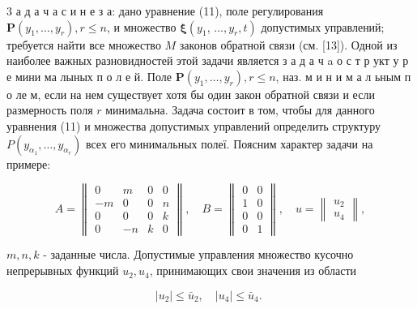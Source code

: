 \documentclass[10pt]{article}
\begin{document}
3 а д а ч а с и н е з а: дано уравнение (11), поле регулирования $\boldsymbol{P}\left(y_{1}, \ldots, y_{r}\right), r \leqslant n$, и множество $\boldsymbol{\xi}\left(y_{1}\right.$, $\left.\ldots, y_{r}, t\right)$ допустимых управлений; требуется найти все множество $M$ законов обратной связи (см. [13]). Одной из наиболее важных разновидностей этой задачи является з а д а ч a о с т р укт у р е мини ма лыных п о л е й. Поле $\boldsymbol{P}\left(y_{1}, \ldots, y_{r}\right), r \leqslant n$, наз. м и н и м а л ьным п о ле м, если на нем существует хотя бы один закон обратной связи и если размерность поля $r$ минимальна. Задача состоит в том, чтобы для данного уравнения (11) и множества допустимых управлений определить структуру $P\left(y_{\alpha_{1}}, \ldots, y_{\alpha_{r}}\right)$ всех его минимальных полеї. Поясним характер задачи на примере:



\[

A=\left\|\begin{array}{rrrr}

0 & m & 0 & 0 \\

-m & 0 & 0 & n \\

0 & 0 & 0 & k \\

0 & -n & k & 0

\end{array}\right\|, \quad B=\left\|\begin{array}{ll}

0 & 0 \\

1 & 0 \\

0 & 0 \\

0 & 1

\end{array}\right\|, \quad u=\left\|\begin{array}{l}

u_{2} \\

u_{4}

\end{array}\right\|,

\]



$m, n, k$ - заданные числа. Допустимые управления множество кусочно непрерывных функций $u_{2}, u_{4}$, принимающих свои значения из области



\[

\left|u_{2}\right| \leqslant \bar{u}_{2}, \quad\left|u_{4}\right| \leqslant \bar{u}_{4} \text {. }

\]
\end{document}
